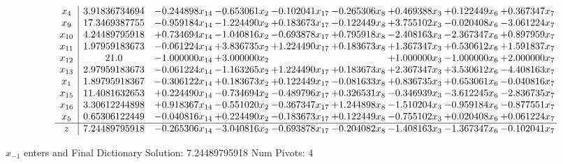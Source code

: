 \documentclass[10pt]{article}
\begin{document}
 \[\begin{array}{c| c c@{\hskip 2pt} c@{\hskip 2pt} c@{\hskip 2pt} c@{\hskip 2pt} c@{\hskip 2pt} c@{\hskip 2pt} c@{\hskip 2pt} }
 x_{4}   &  3.91836734694 & -0.244898 x_{14} & -0.653061 x_{2} & -0.102041 x_{17} & -0.265306 x_{8} & + 0.469388 x_{3} & + 0.122449 x_{6} & + 0.367347 x_{7}\\
 x_{9}   &  17.3469387755 & -0.959184 x_{14} & -1.224490 x_{2} & + 0.183673 x_{17} & -0.122449 x_{8} & + 3.755102 x_{3} & -0.020408 x_{6} & -3.061224 x_{7}\\
 x_{10}   &  4.24489795918 & + 0.734694 x_{14} & -1.040816 x_{2} & -0.693878 x_{17} & + 0.795918 x_{8} & -2.408163 x_{3} & -2.367347 x_{6} & + 0.897959 x_{7}\\
 x_{11}   &  1.97959183673 & -0.061224 x_{14} & + 3.836735 x_{2} & + 1.224490 x_{17} & + 0.183673 x_{8} & + 1.367347 x_{3} & + 0.530612 x_{6} & + 1.591837 x_{7}\\
 x_{12}   &  21.0 & -1.000000 x_{14} & + 3.000000 x_{2} &    &   & + 1.000000 x_{3} & -1.000000 x_{6} & + 2.000000 x_{7}\\
 x_{13}   &  2.97959183673 & -0.061224 x_{14} & -1.163265 x_{2} & + 1.224490 x_{17} & + 0.183673 x_{8} & + 2.367347 x_{3} & + 3.530612 x_{6} & -4.408163 x_{7}\\
 x_{1}   &  1.89795918367 & -0.306122 x_{14} & + 0.183673 x_{2} & + 0.122449 x_{17} & -0.081633 x_{8} & + 0.836735 x_{3} & + 0.653061 x_{6} & -0.040816 x_{7}\\
 x_{15}   &  11.4081632653 & + 0.224490 x_{14} & -0.734694 x_{2} & -0.489796 x_{17} & + 0.326531 x_{8} & -0.346939 x_{3} & -3.612245 x_{6} & -2.836735 x_{7}\\
 x_{16}   &  3.30612244898 & + 0.918367 x_{14} & -0.551020 x_{2} & -0.367347 x_{17} & + 1.244898 x_{8} & -1.510204 x_{3} & -0.959184 x_{6} & -0.877551 x_{7}\\
 x_{5}   &  0.65306122449 & -0.040816 x_{14} & + 0.224490 x_{2} & -0.183673 x_{17} & + 0.122449 x_{8} & -0.755102 x_{3} & + 0.020408 x_{6} & + 0.061224 x_{7}\\
\hline
z    &  7.24489795918 & -0.265306 x_{14} & -3.040816 x_{2} & -0.693878 x_{17} & -0.204082 x_{8} & -1.408163 x_{3} & -1.367347 x_{6} & -0.102041 x_{7}\\
\end{array}\]


 $ x_{-1} $ enters and Final Dictionary
Solution:  7.24489795918
Num Pivots:  4
\end{document}
